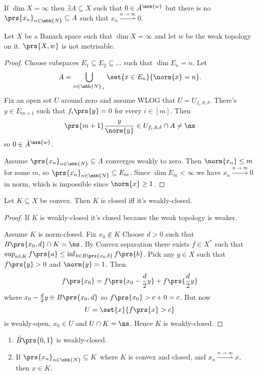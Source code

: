 \documentclass[10pt, twoside]{book}
\begin{document}
\begin{proposition}
If $\dim X = \infty$ then $\exists A \subseteq X$ such that $0 \in \bar{A}^{\mrm{w}}$ but there is no $\prs{x_n}_{n \in \mbb{N}} \subseteq A$ such that $x_n \overset{n\to\infty}{\rightharpoonup} 0$.
\end{proposition}

\begin{corollary}
Let $X$ be a Banach space such that $\dim X = \infty$ and let $w$ be the weak topology on it. $\prs{X,w}$ is not metrisable.
\end{corollary}

\begin{proof}
Choose subspaces $E_1 \subseteq E_2 \subseteq \ldots$ such that $\dim E_n = n$. Let 
\[A = \bigcup_{n \in \mbb{N}_+} \set{x \in E_n}{\norm{x} = n}  \text{.}\]
Fix an open set $U$ around zero and assume WLOG that $U = U_{f_i, 0, \delta}$.
There's $y \in E_{m+1}$ such that $f_i\prs{y} = 0$ for every $i \in [m]$. Then
\[\prs{m+1} \frac{y}{\norm{y}} \in U_{f_i, 0, \delta} \cap A \neq \ns\]
so $0 \in \bar{A}^{\mrm{w}}$.

Assume $\prs{x_n}_{n \in \mbb{N}} \subseteq A$ converges weakly to zero. Then $\norm{x_n} \leq m$ for some $m$, so $\prs{x_n}_{n \in \mbb{N}} \subseteq E_m$. Since $\dim E_m < \infty$ we have $x_n \xrightarrow{n\to\infty} 0$ in norm, which is impossible since $\norm{x} \geq 1$.
\end{proof}

\begin{proposition}
Let $K \subseteq X$ be convex. Then $K$ is closed iff it's weakly-closed.
\end{proposition}

\begin{proof}
If $K$ is weakly-closed it's closed because the weak topology is weaker.

Assume $K$ is norm-closed. Fix $x_0 \notin K$ Choose $d > 0$ such that $B\prs{x_0, d} \cap K = \ns$. By Convex separation there exists $f \in X^*$ such that $\sup_{a \in K} f\prs{a} \leq \inf_{b \in B\prs{x_0, \delta}} f\prs{b}$.
Pick any $y \in X$ such that $f\prs{y} > 0$ and $\norm{y} =1$. Then
\[f\prs{x_0} = f\prs{x_0 - \frac{d}{2} y} + f\prs{\frac{d}{2} y}\]
where $x_0 - \frac{d}{2} y \in B\prs{x_0, d}$ so $f\prs{x_0} > c + 0 = c$.
But now
\[U = \set{x}{f\prs{x} > c}\]
is weakly-open, $x_0 \in U$ and $U \cap K = \ns$. Hence $K$ is weakly-closed.
\end{proof}

\begin{corollary}
\begin{enumerate}
\item $\bar{B}\prs{0,1}$ is weakly-closed.
\item If $\prs{x_n}_{n \in \mbb{N}} \subseteq K$ where $K$ is convex and closed, and $x_n \overset{n\to\infty}{\rightharpoonup} x$, then $x \in K$.
\end{enumerate}
\end{corollary}
\end{document}
